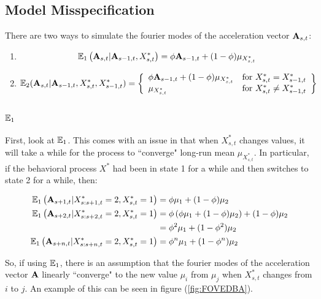 

\iffalse
\subsection{Model Misspecification}

There are two ways to simulate the fourier modes of the acceleration vector $\mathbf{A}_{s,t}$:

\begin{enumerate}
	\item $$\mathbb{E}_1\left(\mathbf{A}_{s,t} | \mathbf{A}_{s-1,t}, X^*_{s,t}\right) = \phi \mathbf{A}_{s-1,t} + (1-\phi) \mu_{X^*_{s,t}} $$
	
	\item $$\mathbb{E}_2(\mathbf{A}_{s,t} | \mathbf{A}_{s-1,t}, X^*_{s,t}, X^*_{s-1,t}) = \left\{\begin{array}{lr}
	\phi \mathbf{A}_{s-1,t} + (1-\phi) \mu_{X^*_{s,t}} & \text{for } X^*_{s,t} = X^*_{s-1,t}\\
	\mu_{X^*_{s,t}} & \text{for } X^*_{s,t} \neq X^*_{s-1,t}
	\end{array}\right\}$$
\end{enumerate}

\subsubsection{$\mathbb{E}_1$}

First, look at $\mathbb{E}_1$. This comes with an issue in that when $X^*_{s,t}$ changes values, it will take a while for the process to ``converge" long-run mean $\mu_{X^*_{s,t}}$. In particular, if the behavioral process $X^*$ had been in state 1 for a while and then switches to state 2 for a while, then:

\begin{align*}
	\mathbb{E}_1\left(\mathbf{A}_{s+1,t}|X^*_{s:s+1,t} = 2, X^*_{s,t} = 1\right) &=  \phi \mu_1 + (1-\phi) \mu_2 \\
	\mathbb{E}_1\left(\mathbf{A}_{s+2,t}|X^*_{s:s+2,t} = 2, X^*_{s,t} = 1\right) &= \phi\left( \phi \mu_1 + (1-\phi) \mu_2\right) + (1-\phi)\mu_2 \\
	&= \phi^2 \mu_1 + (1-\phi^2) \mu_2\\
	\mathbb{E}_1\left(\mathbf{A}_{s+n,t}|X^*_{s:s+n,t} = 2, X^*_{s,t} = 1\right) &=  \phi^n \mu_1 + (1-\phi^n) \mu_2 \\
\end{align*}

So, if using $\mathbb{E}_1$, there is an assumption that the fourier modes of the acceleration vector $\mathbf{A}$ linearly ``converge" to the new value $\mu_i$ from $\mu_j$ when $X^*_{s,t}$ changes from $i$ to $j$. An example of this can be seen in figure (\ref{fig:FOVEDBA}).

